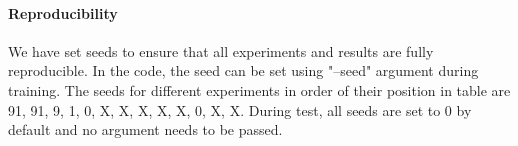 \documentclass[12pt]{article}
\begin{document}
\paragraph{Reproducibility} We have set seeds to ensure that all experiments and results are fully reproducible. In the code, the seed can be set using "--seed" argument during training. The seeds for different experiments in order of their position in table are 91, 91, 9, 1, 0, X, X, X, X, X, 0, X, X. During test, all seeds are set to 0 by default and no argument needs to be passed.

\pagebreak[4]

\nocite{*}


\end{document}
